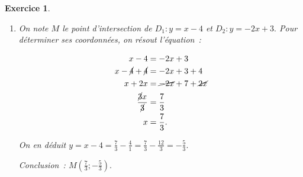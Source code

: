 \documentclass[10pt]{article}
\newtheorem{exo}{Exercice}
\begin{document}
\begin{exo}
\begin{enumerate}
\item On note $M$ le point d'intersection de $D_1:y=x-4$ et $D_2:y=-2x+3.$ Pour déterminer ses coordonnées, on résout l'équation~:

\begin{align*}
x-4&=-2x+3\\
x-\cancel{4}+\cancel{4}&=-2x+3+4\\
x+2x&=\cancel{-2x}+7+\cancel{2x}\\
\frac{\cancel{3}x}{\cancel{3}}&=\frac{7}{3}\\
x&=\frac{7}{3}.
\end{align*}

On en déduit $y=x-4=\frac{7}{3}-\frac{4}{1}=\frac{7}{3}-\frac{12}{3}=-\frac{5}{3}.$

Conclusion~: $M\left(\frac{7}{3};-\frac{5}{3}\right).$
\end{enumerate}

\end{exo}
\end{document}
